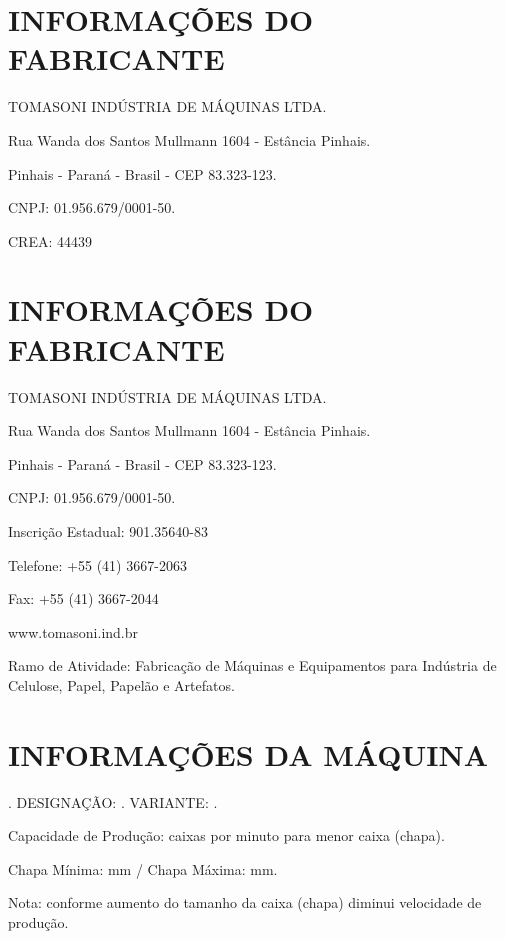 
\thispagestyle{fancy}

\vspace*{\fill}

\section{\large{INFORMAÇÕES DO FABRICANTE}}

TOMASONI INDÚSTRIA DE MÁQUINAS LTDA.

Rua Wanda dos Santos Mullmann 1604 - Estância Pinhais.

Pinhais - Paraná - Brasil - CEP 83.323-123.

CNPJ: 01.956.679/0001-50.

CREA: 44439

\vspace*{\fill}

\section{\large{INFORMAÇÕES DO FABRICANTE}}

TOMASONI INDÚSTRIA DE MÁQUINAS LTDA.

Rua Wanda dos Santos Mullmann 1604 - Estância Pinhais.

Pinhais - Paraná - Brasil - CEP 83.323-123.

CNPJ: 01.956.679/0001-50.

Inscrição Estadual: 901.35640-83

Telefone: +55 (41) 3667-2063

Fax: +55 (41) 3667-2044

www.tomasoni.ind.br

Ramo de Atividade: Fabricação de Máquinas e Equipamentos para Indústria de Celulose, Papel, Papelão e Artefatos.

\vspace{40 pt}

\section{\large{INFORMAÇÕES DA MÁQUINA}}


\machineName \space. DESIGNAÇÃO: \machineShortName. VARIANTE: \variant.

Capacidade de Produção: \productionCapacityminimumSheet \space caixas por minuto para menor caixa (chapa).

Chapa Mínima: \minimumSheet mm / Chapa Máxima: \maximumSheet mm.

Nota: conforme aumento do tamanho da caixa (chapa) diminui velocidade de produção.

